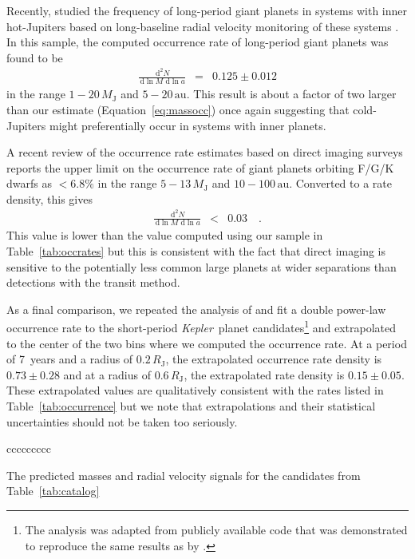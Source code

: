 \documentclass[manuscript, letterpaper]{aastex6}
\newcommand{\project}[1]{\textsl{#1}}
\newcommand{\kepler}{\project{Kepler}}
\renewcommand{\eqref}[1]{\ref{eq:#1}}
\newcommand{\eqalt}[1]{Equation~\eqref{#1}}
\newcommand{\dd}{\ensuremath{\,\mathrm{d}}}
\newcommand{\unit}[1]{{\ensuremath{\,\mathrm{#1}}}}
\begin{document}
Recently, \citet{Bryan:2016} studied the frequency of long-period giant
planets in systems with inner hot-Jupiters based on long-baseline radial
velocity monitoring of these systems \citep{Knutson:2014}.
In this sample, the computed occurrence rate of long-period giant planets was
found to be
\begin{eqnarray}
\frac{\dd^2 N}{\dd\ln M\,\dd\ln a} &=& 0.125 \pm 0.012
\end{eqnarray}
in the range $1-20\,M_\mathrm{J}$ and $5-20\unit{au}$.
This result is about a factor of two larger than our estimate
(\eqalt{massocc}) once again suggesting that cold-Jupiters might
preferentially occur in systems with inner planets.

A recent review of the occurrence rate estimates based on direct imaging
surveys \citep{Bowler:2016} reports the upper limit on the occurrence rate of
giant planets orbiting F/G/K dwarfs as $<6.8\%$ in the range
$5-13\,M_\mathrm{J}$ and $10-100\unit{au}$.
Converted to a rate density, this gives
\begin{eqnarray}
\frac{\dd^2 N}{\dd\ln M\,\dd\ln a} &<& 0.03 \quad.
\end{eqnarray} This value is lower than the value computed using our sample in
Table~\ref{tab:occrates} but this is consistent with the fact that direct
imaging is sensitive to the potentially less common large planets at wider
separations than detections with the transit method.

As a final comparison, we repeated the analysis of \citet{Burke:2015} and fit
a double power-law occurrence rate to the short-period \kepler\ planet
candidates\footnote{The analysis was adapted from publicly available code that
was demonstrated to reproduce the same results as \citet{Burke:2015} by
\citet{Foreman-Mackey:2015a}.} and extrapolated to the center of the two bins
where we computed the occurrence rate.
At a period of 7~years and a radius of $0.2\,R_\mathrm{J}$, the extrapolated
occurrence rate density is $0.73\pm0.28$ and at a radius of
$0.6\,R_\mathrm{J}$, the extrapolated rate density is $0.15\pm0.05$.
These extrapolated values are qualitatively consistent with the rates listed
in Table~\ref{tab:occurrence} but we note that extrapolations and their
statistical uncertainties should not be taken too seriously.


\begin{floattable}
\begin{deluxetable}{ccccccccc}
\tabletypesize{\footnotesize}
\caption{The predicted masses and radial velocity signals for the candidates
from Table~\ref{tab:catalog} \label{tab:masses}}

\end{deluxetable}
\end{floattable}
\end{document}

